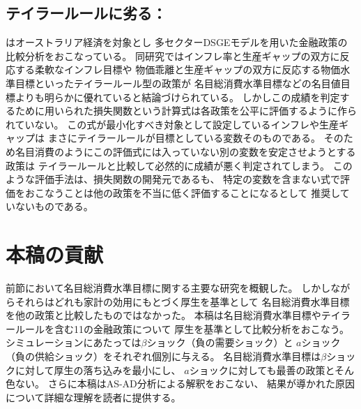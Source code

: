 \subsection{テイラールールに劣る：\textcite{Gross2023}}
\label{sec:chapter2_review_gross_2023}
\textcite{Gross2023}はオーストラリア経済を対象とし
多セクターDSGEモデルを用いた金融政策の比較分析をおこなっている。
同研究ではインフレ率と生産ギャップの双方に反応する柔軟なインフレ目標や
物価乖離と生産ギャップの双方に反応する物価水準目標といったテイラールール型の政策が
名目総消費水準目標などの名目値目標よりも明らかに優れていると結論づけられている。
しかしこの成績を判定するために用いられた損失関数という計算式は各政策を公平に評価するように作られていない。
この式が最小化すべき対象として設定しているインフレや生産ギャップは
まさにテイラールールが目標としている変数そのものである。
そのため名目消費のようにこの評価式には入っていない別の変数を安定させようとする政策は
テイラールールと比較して必然的に成績が悪く判定されてしまう。
このような評価手法は、損失関数の開発元である\textcite{DorichMendesZhang2021}も、
特定の変数を含まない式で評価をおこなうことは他の政策を不当に低く評価することになるとして
推奨していないものである。

\section{本稿の貢献}
\label{sec:chapter2_review_our_contribution}
前節において名目総消費水準目標に関する主要な研究を概観した。
しかしながらそれらはどれも家計の効用にもとづく厚生を基準として
名目総消費水準目標を他の政策と比較したものではなかった。
本稿は名目総消費水準目標やテイラールールを含む11の金融政策について
厚生を基準として比較分析をおこなう。
シミュレーションにあたっては\(\beta\)ショック（負の需要ショック）と
 \(a\)ショック（負の供給ショック）をそれぞれ個別に与える。
名目総消費水準目標は\(\beta\)ショックに対して厚生の落ち込みを最小にし、
 \(a\)ショックに対しても最善の政策とそん色ない。
さらに本稿はAS-AD分析による解釈をおこない、
結果が導かれた原因について詳細な理解を読者に提供する。